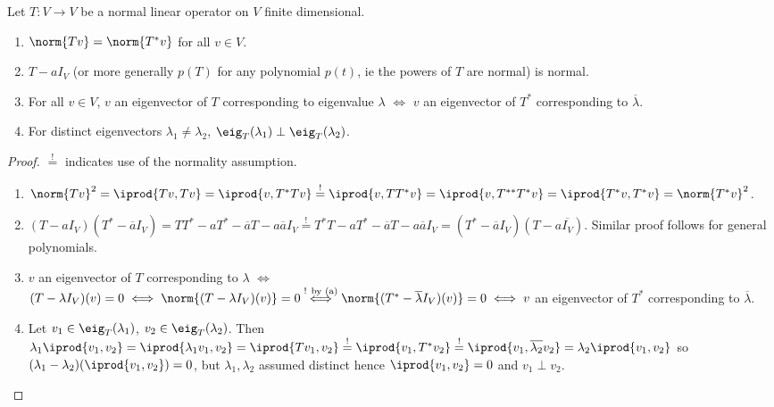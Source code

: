 \begin{proposition}\label{prop:propertiesofnormaloperators}
    Let $T : V \to V$ be a normal linear operator on $V$ finite dimensional. \begin{enumerate}[label=(\alph*)]
        \item $\norm{Tv} = \norm{T^\ast v}$ for all $v \in V$.
        \item $T - a I_V$ (or more generally $p(T)$ for any polynomial $p(t)$, ie the powers of $T$ are normal) is normal.
        \item For all $v \in V$, $v$ an eigenvector of $T$ corresponding to eigenvalue $\lambda$ $\iff$ $v$ an eigenvector of $T^\ast$ corresponding to $\overline{\lambda}$.
        \item For distinct eigenvectors $\lambda_1 \neq \lambda_2$, $\eig_T(\lambda_1) \perp \eig_T(\lambda_2)$.
    \end{enumerate}
\end{proposition}

\begin{proof}
    $\overset{!}{=}$ indicates use of the normality assumption.
    \begin{enumerate}[label=(\alph*)]
        \item $\norm{Tv}^2 = \iprod{Tv, Tv} = \iprod{v, T^\ast T v} \overset{!}{=} \iprod{v, T T^\ast v} = \iprod{v, T^{\ast \ast} T^{\ast} v} = \iprod{T^\ast v, T^\ast v} = \norm{T^\ast v}^2$.
        \item $(T - aI_V)(T^\ast - \overline{a} I_V) = T T^\ast - a T^\ast - \overline{a} T - a \overline{a}I_V \overset{!}{=} T^\ast T - aT^\ast - \overline{a}T - a \overline{a} I_V = (T^\ast - \overline{a} I_V)(T - a \overline{I_V})$. Similar proof follows for general polynomials.
        \item $v$ an eigenvector of $T$ corresponding to $\lambda$ $\iff$ $(T - \lambda I_V)(v) = 0 \iff \norm{(T-\lambda I_V)(v)} = 0 \overset{\text{! by (a)}}{\iff} \norm{(T^\ast - \overline{\lambda} I_V)(v)} =0 \iff v$ an eigenvector of $T^\ast$ corresponding to $\overline{\lambda}$.
        \item Let $v_1 \in \eig_T(\lambda_1)$, $v_2 \in \eig_T(\lambda_2)$. Then $\lambda_1 \iprod{v_1, v_2} = \iprod{\lambda_1 v_1, v_2} = \iprod{Tv_1, v_2} \overset{!}{=} \iprod{v_1, T^\ast v_2} \overset{!}{=} \iprod{v_1, \overline{\lambda_2} v_2} = \lambda_2 \iprod{v_1, v_2}$ so $(\lambda_1 - \lambda_2)(\iprod{v_1, v_2}) = 0$, but $\lambda_1, \lambda_2$ assumed distinct hence $\iprod{v_1, v_2} = 0$ and $v_1 \perp v_2$.
    \end{enumerate}
\end{proof}